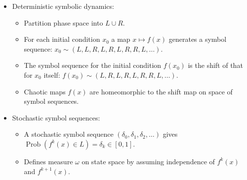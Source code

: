 \documentclass[12pt,t]{beamer}
\begin{document}
\begin{frame}
  \begin{itemize}
    \item Deterministic symbolic dynamics:
      \begin{itemize}
      \item Partition phase space into $L \cup R$.
      \item For each initial condition $x_0$ a map $x \mapsto f(x)$
        generates a symbol sequence: $x_0 \sim (L, L, R, L, R, L, R,
        R, L, \ldots)$.
      \item The symbol sequence for the initial condition $f(x_0)$ is
        the shift of that for $x_0$ itself: $f(x_0) \sim (L, R, L, R,
        L, R, R, L, \ldots)$.
      \item Chaotic maps $f(x)$ are homeomorphic to the shift map on
        space of symbol sequences.
      \end{itemize}
    \item Stochastic symbol sequences:
      \begin{itemize}
      \item A stochastic symbol sequence $(\delta_0, \delta_1,
        \delta_2, \ldots)$ gives $\operatorname*{Prob}(f^k(x) \in L) =
        \delta_k \in [0,1]$.
      \item Defines measure $\omega$ on state space by assuming
        independence of $f^k(x)$ and $f^{k+1}(x)$.
      \end{itemize}
  \end{itemize}
\end{frame}
\end{document}
